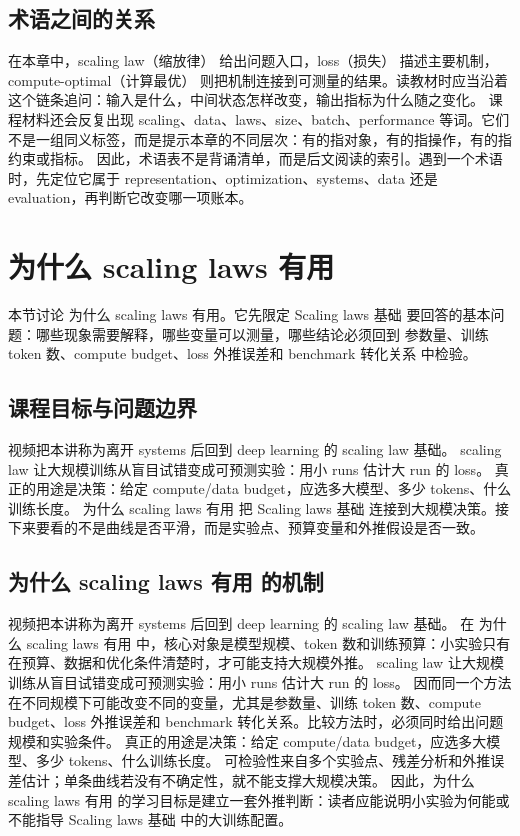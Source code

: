 \documentclass[a4paper]{article}
\begin{document}
\subsection{术语之间的关系}
在本章中，scaling law（缩放律） 给出问题入口，loss（损失） 描述主要机制，compute-optimal（计算最优） 则把机制连接到可测量的结果。读教材时应当沿着这个链条追问：输入是什么，中间状态怎样改变，输出指标为什么随之变化。
课程材料还会反复出现 scaling、data、laws、size、batch、performance 等词。它们不是一组同义标签，而是提示本章的不同层次：有的指对象，有的指操作，有的指约束或指标。
因此，术语表不是背诵清单，而是后文阅读的索引。遇到一个术语时，先定位它属于 representation、optimization、systems、data 还是 evaluation，再判断它改变哪一项账本。
\section{为什么 scaling laws 有用}
本节讨论 为什么 scaling laws 有用。它先限定 Scaling laws 基础 要回答的基本问题：哪些现象需要解释，哪些变量可以测量，哪些结论必须回到 参数量、训练 token 数、compute budget、loss 外推误差和 benchmark 转化关系 中检验。
\subsection{课程目标与问题边界}
视频把本讲称为离开 systems 后回到 deep learning 的 scaling law 基础。
scaling law 让大规模训练从盲目试错变成可预测实验：用小 runs 估计大 run 的 loss。
真正的用途是决策：给定 compute/data budget，应选多大模型、多少 tokens、什么训练长度。
为什么 scaling laws 有用 把 Scaling laws 基础 连接到大规模决策。接下来要看的不是曲线是否平滑，而是实验点、预算变量和外推假设是否一致。
\subsection{为什么 scaling laws 有用 的机制}
视频把本讲称为离开 systems 后回到 deep learning 的 scaling law 基础。 在 为什么 scaling laws 有用 中，核心对象是模型规模、token 数和训练预算：小实验只有在预算、数据和优化条件清楚时，才可能支持大规模外推。
scaling law 让大规模训练从盲目试错变成可预测实验：用小 runs 估计大 run 的 loss。 因而同一个方法在不同规模下可能改变不同的变量，尤其是参数量、训练 token 数、compute budget、loss 外推误差和 benchmark 转化关系。比较方法时，必须同时给出问题规模和实验条件。
真正的用途是决策：给定 compute/data budget，应选多大模型、多少 tokens、什么训练长度。 可检验性来自多个实验点、残差分析和外推误差估计；单条曲线若没有不确定性，就不能支撑大规模决策。
因此，为什么 scaling laws 有用 的学习目标是建立一套外推判断：读者应能说明小实验为何能或不能指导 Scaling laws 基础 中的大训练配置。
\end{document}

